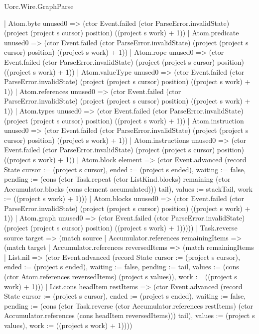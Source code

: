 \begin{lexlean}{Uorc.Wire.GraphParse}
\begin{semanticmodule}
{            | Atom.byte unused0 => (ctor Event.failed (ctor ParseError.invalidState) (project (project s cursor) position) ((project s work) + 1))
            | Atom.predicate unused0 => (ctor Event.failed (ctor ParseError.invalidState) (project (project s cursor) position) ((project s work) + 1))
            | Atom.rope unused0 => (ctor Event.failed (ctor ParseError.invalidState) (project (project s cursor) position) ((project s work) + 1))
            | Atom.valueType unused0 => (ctor Event.failed (ctor ParseError.invalidState) (project (project s cursor) position) ((project s work) + 1))
            | Atom.references unused0 => (ctor Event.failed (ctor ParseError.invalidState) (project (project s cursor) position) ((project s work) + 1))
            | Atom.types unused0 => (ctor Event.failed (ctor ParseError.invalidState) (project (project s cursor) position) ((project s work) + 1))
            | Atom.instruction unused0 => (ctor Event.failed (ctor ParseError.invalidState) (project (project s cursor) position) ((project s work) + 1))
            | Atom.instructions unused0 => (ctor Event.failed (ctor ParseError.invalidState) (project (project s cursor) position) ((project s work) + 1))
            | Atom.block element => (ctor Event.advanced (record State {cursor := (project s cursor), ended := (project s ended), waiting := false, pending := (cons (ctor Task.repeat (ctor ListKind.blocks) remaining (ctor Accumulator.blocks (cons element accumulated))) tail), values := stackTail, work := ((project s work) + 1)}))
            | Atom.blocks unused0 => (ctor Event.failed (ctor ParseError.invalidState) (project (project s cursor) position) ((project s work) + 1))
            | Atom.graph unused0 => (ctor Event.failed (ctor ParseError.invalidState) (project (project s cursor) position) ((project s work) + 1)))))
      | Task.reverse source target => (match source
        | Accumulator.references remainingItems => (match target
          | Accumulator.references reversedItems => (match remainingItems
            | List.nil => (ctor Event.advanced (record State {cursor := (project s cursor), ended := (project s ended), waiting := false, pending := tail, values := (cons (ctor Atom.references reversedItems) (project s values)), work := ((project s work) + 1)}))
            | List.cons headItem restItems => (ctor Event.advanced (record State {cursor := (project s cursor), ended := (project s ended), waiting := false, pending := (cons (ctor Task.reverse (ctor Accumulator.references restItems) (ctor Accumulator.references (cons headItem reversedItems))) tail), values := (project s values), work := ((project s work) + 1)})))
}
\end{semanticmodule}
\end{lexlean}

